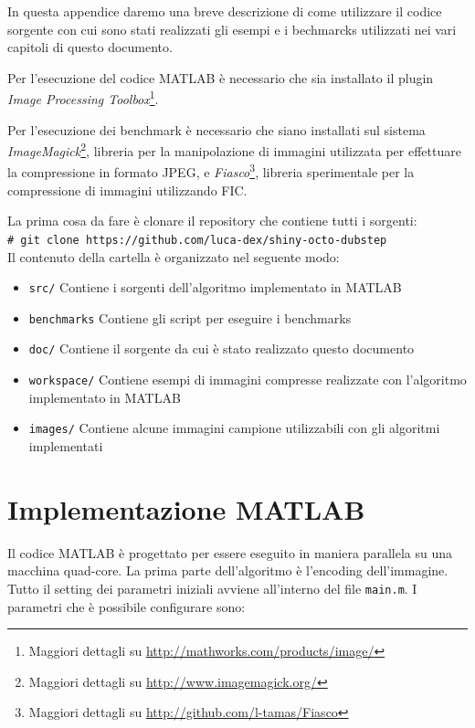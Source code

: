 \documentclass[11pt,a4paper,appendixprefix=true,numbers=noenddot]{scrreprt}
\newcommand{\shellcmd}[1]{\\\indent\indent\texttt{\footnotesize\# #1}\\}
\begin{document}
In questa appendice daremo una breve descrizione di come utilizzare il codice sorgente con cui sono stati realizzati gli esempi e i bechmarcks utilizzati nei vari capitoli di questo documento. 

Per l'esecuzione del codice MATLAB è necessario che sia installato il plugin \textit{Image Processing Toolbox}\footnote{Maggiori dettagli su \url{http://mathworks.com/products/image/}}.

Per l'esecuzione dei benchmark è necessario che siano installati sul sistema \textit{ImageMagick}\footnote{Maggiori dettagli su \url{http://www.imagemagick.org/}}, libreria per la manipolazione di immagini utilizzata per effettuare la compressione in formato JPEG, e \textit{Fiasco}\footnote{Maggiori dettagli su \url{http://github.com/l-tamas/Fiasco}}, libreria sperimentale per la compressione di immagini utilizzando FIC.

\noindent La prima cosa da fare è clonare il repository che contiene tutti i sorgenti:
\shellcmd{git clone https://github.com/luca-dex/shiny-octo-dubstep}

Il contenuto della cartella è organizzato nel seguente modo:

\begin{itemize}
\item \texttt{src/} Contiene i sorgenti dell'algoritmo implementato in MATLAB
\item \texttt{benchmarks} Contiene gli script per eseguire i benchmarks
\item \texttt{doc/} Contiene il sorgente da cui è stato realizzato questo documento
\item \texttt{workspace/} Contiene esempi di immagini compresse realizzate con l'algoritmo implementato in MATLAB
\item \texttt{images/} Contiene alcune immagini campione utilizzabili con gli algoritmi implementati
\end{itemize}

\section{Implementazione MATLAB}

Il codice MATLAB è progettato per essere eseguito in maniera parallela su una macchina quad-core. La prima parte dell'algoritmo è l'encoding dell'immagine. Tutto il setting dei parametri iniziali avviene all'interno del file \texttt{main.m}. I parametri che è possibile configurare sono:
\end{document}
